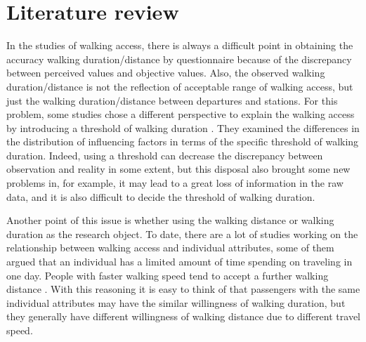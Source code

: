 %
\section{Literature review}

In the studies of walking access, there is always a difficult point in obtaining the accuracy walking duration/distance by questionnaire because of the discrepancy between perceived values and objective values. Also, the observed walking duration/distance is not the reflection of acceptable range of walking access, but just the walking duration/distance between departures and stations. For this problem, some studies chose a different perspective to explain the walking access by introducing a threshold of walking duration \cite{besser2005walking,mccormack2008objective}. They examined the differences in the distribution of influencing factors in terms of the specific threshold of walking duration. Indeed, using a threshold can decrease the discrepancy between observation and reality in some extent, but this disposal also brought some new problems in, for example, it may lead to a great loss of information in the raw data, and it is also difficult to decide the threshold of walking duration.

%
Another point of this issue is whether using the walking distance or walking duration as the research object. To date, there are a lot of studies working on the relationship between walking access and individual attributes, some of them argued that an individual has a limited amount of time spending on traveling in one day. People with faster walking speed tend to accept a further walking distance  \cite{marchetti1994anthropological,larsen2010beyond}. With this reasoning it is easy to think of that passengers with the same individual attributes may have the similar willingness of walking duration, but they generally have different willingness of walking distance due to different travel speed.

